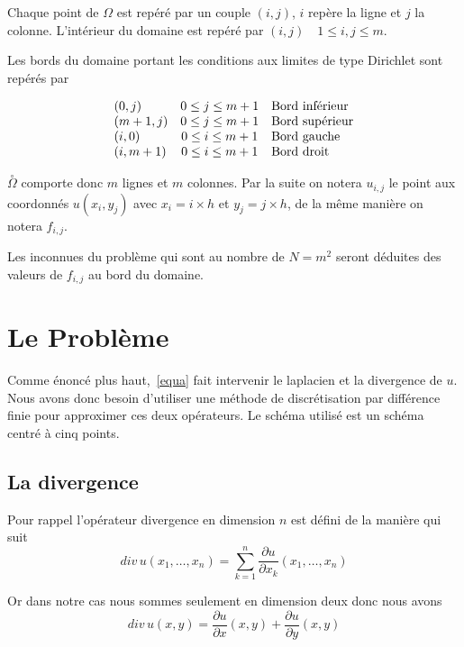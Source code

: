 \documentclass[twoside,12pt]{report}
\theoremstyle{remark}
\begin{document}
Chaque point de $\Omega$ est repéré par un couple $(i,j)$, $i$ repère la ligne et $j$ la colonne. L'intérieur du domaine est repéré par $(i,j)\quad 1\leq i,j \leq m$.

Les bords du domaine portant les conditions aux limites de type Dirichlet sont repérés par

\begin{equation*}
\begin{array}{l c l}
(0,j) &0\leq j \leq m+1 &\mbox{Bord inférieur}\\
(m+1,j) &0\leq j \leq m+1 &\mbox{Bord supérieur}\\
(i,0) &0\leq i \leq m+1 &\mbox{Bord gauche}\\
(i,m+1) &0\leq i \leq m+1 &\mbox{Bord droit}
\end{array}
\end{equation*}


\label{numerotation}

$\overset{\circ}{\Omega}$ comporte donc $m$ lignes et $m$ colonnes. Par la suite on notera $u_{i,j}$ le point aux coordonnés $u(x_i,y_j)$ avec $x_i=i\times h$ et $y_j=j\times h$, de la même manière on notera $f_{i,j}$.

Les inconnues du problème qui sont au nombre de $N=m^2$ seront déduites des valeurs de $f_{i,j}$ au bord du domaine.

\section{Le Problème}\label{probl}

Comme énoncé plus haut,~\eqref{equa} fait intervenir le laplacien et la divergence de $u$. Nous avons donc besoin d'utiliser une méthode de discrétisation par différence finie pour approximer ces deux opérateurs. Le schéma utilisé est un schéma centré à cinq points.

\subsection{La divergence}
 
Pour rappel l'opérateur divergence en dimension $n$ est défini de la manière qui suit
\begin{equation*}
div\, u(x_{1},\ldots,x_{n})=\sum \limits_{k=1}^n \frac{\partial u}{\partial x_k} (x_{1},\ldots,x_{n})
\end{equation*}

Or dans notre cas nous sommes seulement en dimension deux donc nous avons
\begin{equation*}
div\, u(x,y)=\frac{\partial u}{\partial x}(x,y)+\frac{\partial u}{\partial y}(x,y)
\end{equation*}
\end{document}

